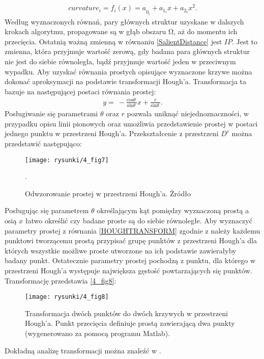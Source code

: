 \documentclass[a4paper,12pt,twoside,openany]{report}
\begin{document}
\begin{align}
curvature_i={f_i\left(x\right)=a}_{0_i}+a_{1_i}x+a_{2_i}x^2.
\end{align}
Według wyznaczonych równań, pary głównych struktur uzyskane w dalszych krokach algorytmu, propagowane są w głąb obszaru $\mathrm{\Omega }$, aż do momentu ich przecięcia. Ostatnią ważną zmienną w równaniu \eqref{SalientDistance} jest $IP$. Jest to zmienna, która przyjmuje wartość zerową, gdy badana para głównych struktur nie jest do siebie równoległa, bądź przyjmuje wartość jeden w przeciwnym wypadku. Aby uzyskać równania prostych opisujące wyznaczone krzywe można dokonać aproksymacji na podstawie transformacji Hough'a. Transformacja ta bazuje na następującej postaci równania prostej:
\begin{align}
y=\ -\frac{{\mathrm{cos} \theta \ }}{{\mathrm{sin} \theta \ }}x+\frac{r}{{\mathrm{sin} \theta \ }}.
\label{HOUGHTRANSFORM}
\end{align}
Posługiwanie się parametrami $\theta $ oraz $r$ pozwala uniknąć niejednoznaczności, w przypadku opisu linii pionowych oraz umożliwia przedstawienie prostej w postaci jednego punktu w przestrzeni Hough'a. Przekształcenie z przestrzeni $D^c$ można przedstawić następująco:
\begin{figure}[!h]
	\centering
	\texttt{[image: rysunki/4\_fig7]}
	\caption{Odwzorowanie prostej w przestrzeni Hough’a. Źródło \cite{houghTransform}}.
\label{4_fig7}
\end{figure}
Posługując się parametrem $\theta$ określającym kąt pomiędzy wyznaczoną prostą a osią $x$ łatwo określić czy badane proste są do siebie równoległe. Aby wyznaczyć parametry prostej z równania \eqref{HOUGHTRANSFORM} zgodnie z \cite{houghTransform} należy każdemu punktowi tworzącemu prostą przypisać grupę punktów z przestrzeni Hough'a dla których wszystkie możliwe proste utworzone na ich podstawie zawierałyby badany punkt. Ostatecznie parametry prostej pochodzą z punktu, dla którego w przestrzeni Hough'a występuje największa gęstość powtarzających się punktów. Transformację przedstawia \autoref{4_fig8}:
\begin{figure}[!h]
	\centering
	\texttt{[image: rysunki/4\_fig8]}
	\caption{Transformacja dwóch punktów do dwóch krzywych w przestrzeni Hough'a. Punkt przecięcia definiuje prostą zawierającą dwa punkty (wygenerowano za pomocą programu Matlab).}
\label{4_fig8}
\end{figure}
Dokładną analizę transformacji można znaleźć w \cite{houghTransform}.
\end{document}

